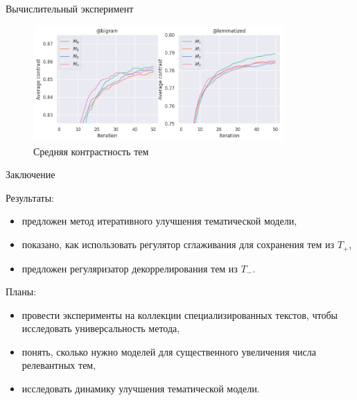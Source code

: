\documentclass{beamer}
\begin{document}
\begin{frame}{Вычислительный эксперимент}

\begin{figure}
\includegraphics[width=0.85\textwidth]{avg_contrast_v3}
\caption{Средняя контрастность тем}
\end{figure}

\end{frame}

\begin{frame}{Заключение}
    \begin{block}{Результаты:}
    \begin{itemize}
        \item предложен метод итеративного улучшения тематической модели,
        \item показано, как использовать регулятор сглаживания для сохранения тем из $T_+$,
        \item предложен регуляризатор декоррелирования тем из $T_-$.
        
    \end{itemize}
    \end{block}

    \begin{block}{Планы:}
    \begin{itemize}
        \item провести эксперименты на коллекции специализированных текстов, чтобы исследовать универсальность метода,
        \item понять, сколько нужно моделей для существенного увеличения числа релевантных тем,
        \item исследовать динамику улучшения тематической модели.
    \end{itemize}
    \end{block}
\end{frame}
\end{document}
